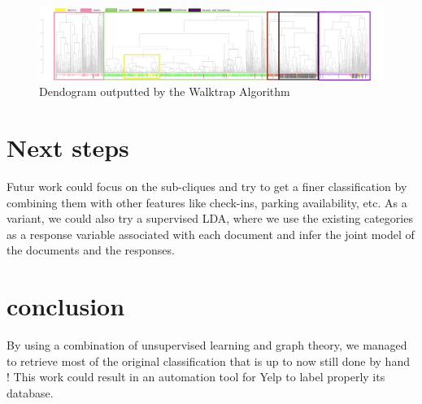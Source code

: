 \documentclass[twoside]{article}
\begin{document}
\begin{multicols}{2}
\begin{figure}
\centering
\includegraphics[angle=90,width=0.25\linewidth]{den_ovi2-1.png}
\caption{Dendogram outputted by the Walktrap Algorithm}
\end{figure}
\newpage

\section{Next steps}
Futur work could focus on the sub-cliques and try to get a finer classification by combining them with other features like check-ins, parking availability, etc. As a variant, we could also try a supervised LDA, where we use the existing categories as a response variable associated with each document and infer the joint model of the documents and the responses.

\section{conclusion}
By using a combination of unsupervised learning and graph theory, we managed to retrieve most of the original classification that is up to now still done by hand ! This work could result in an automation tool for Yelp to label properly its database. 


\nocite{*} %


\end{multicols}
\end{document}
